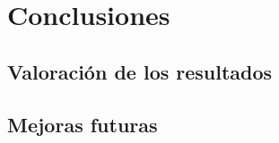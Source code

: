 \chapter{Conclusiones}
\label{chap:conclusiones} 

   
\section{Valoración de los resultados}
\section{Mejoras futuras}
